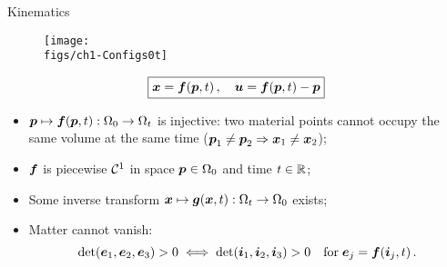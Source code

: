 \begin{frame}{Kinematics}

\begin{figure}
\centering\texttt{[image: \\figs/ch1-Configs0t]}
\end{figure}
\begin{displaymath}
\boxed{{\boldsymbol{x}}={\boldsymbol{f}}({\boldsymbol{p}},t)\,,\quad{\boldsymbol{u}}={\boldsymbol{f}}({\boldsymbol{p}},t)-{\boldsymbol{p}}}
\end{displaymath}
{\footnotesize
\begin{itemize}
\item ${\boldsymbol{p}}\mapsto{\boldsymbol{f}}({\boldsymbol{p}},t):\Omega_0\to\Omega_t$ is injective: two material points cannot occupy the same volume at the same time (${\boldsymbol{p}}_1\neq{\boldsymbol{p}}_2\Rightarrow{\boldsymbol{x}}_1\neq{\boldsymbol{x}}_2$);
\item ${\boldsymbol{f}}$ is piecewise ${\mathcal C}^1$ in space ${\boldsymbol{p}}\in\Omega_0$ and time $t\in\mathbb{R}$;
\item Some inverse transform ${\boldsymbol{x}}\mapsto{\boldsymbol g}({\boldsymbol{x}},t):\Omega_t\to\Omega_0$ exists;
\item Matter cannot vanish:
\begin{displaymath}
\det({\boldsymbol{e}}_1,{\boldsymbol{e}}_2,{\boldsymbol{e}}_3)>0\iff\det({\boldsymbol{i}}_1,{\boldsymbol{i}}_2,{\boldsymbol{i}}_3)>0\quad\text{for}\;{\boldsymbol{e}}_j={\boldsymbol{f}}({\boldsymbol{i}}_j,t)\,.
\end{displaymath}
\end{itemize}}

\end{frame}